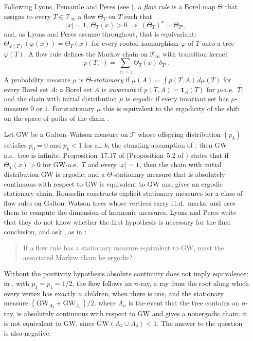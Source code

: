 \documentclass[11pt]{amsart}
\theoremstyle{remark}
\numberwithin{equation}{section}
\newcommand{\T}{\mathcal T}
\newcommand{\GW}{\mathrm{GW}}
\newcommand{\one}{\mathbf 1}
\begin{document}
Following Lyons, Pemantle and Peres \cite{LPP} (see \cite[Section~17.5]{LP}), a \emph{flow rule} is a Borel map $\Theta$ that assigns to every $T\in\T_\infty$ a flow $\Theta_T$ on $T$ such that
\[
|x|=1,\ \Theta_T(x)>0\ \Longrightarrow\ (\Theta_T)^x=\Theta_{T^x},
\]
and, as Lyons and Peres assume throughout, that is equivariant: $\Theta_{\varphi(T)}(\varphi(x))=\Theta_T(x)$ for every rooted isomorphism $\varphi$ of $T$ onto a tree $\varphi(T)$. A flow rule defines the Markov chain on $\T_\infty$ with transition kernel
\[
p(T,\cdot)=\sum_{|x|=1}\Theta_T(x)\,\delta_{T^x}.
\]
A probability measure $\mu$ is $\Theta$-\emph{stationary} if $\mu(A)=\int p(T,A)\,d\mu(T)$ for every Borel set $A$; a Borel set $A$ is \emph{invariant} if $p(T,A)=\one_A(T)$ for $\mu$-a.e.\ $T$; and the chain with initial distribution $\mu$ is \emph{ergodic} if every invariant set has $\mu$-measure $0$ or $1$. For stationary $\mu$ this is equivalent to the ergodicity of the shift on the space of paths of the chain \cite[Corollary~17.3]{LP}.

Let $\GW$ be a Galton--Watson measure on $\T$ whose offspring distribution $(p_k)$ satisfies $p_0=0$ and $p_k<1$ for all $k$, the standing assumption of \cite[Chapter~17]{LP}; then $\GW$-a.e.\ tree is infinite. Proposition~17.17 of \cite{LP} (Proposition~5.2 of \cite{LPP}) states that if $\Theta_T(x)>0$ for $\GW$-a.e.\ $T$ and every $|x|=1$, then the chain with initial distribution $\GW$ is ergodic, and a $\Theta$-stationary measure that is absolutely continuous with respect to $\GW$ is equivalent to $\GW$ and gives an ergodic stationary chain. Rousselin \cite{Ro18} constructs explicit stationary measures for a class of flow rules on Galton--Watson trees whose vertices carry i.i.d.\ marks, and uses them to compute the dimension of harmonic measures. Lyons and Peres write that they do not know whether the first hypothesis is necessary for the final conclusion, and ask \cite[Question~17.18]{LP}, as in \cite[Section~10, Question~3]{LPP}:

\begin{quote}
If a flow rule has a stationary measure equivalent to $\GW$, must the associated Markov chain be ergodic?
\end{quote}

\noindent Without the positivity hypothesis absolute continuity does not imply equivalence: in \cite[Exercise~17.22]{LP}, with $p_3=p_4=1/2$, the flow follows an $n$-ray, a ray from the root along which every vertex has exactly $n$ children, when there is one, and the stationary measure $(\GW_{A_3}+\GW_{A_4})/2$, where $A_n$ is the event that the tree contains an $n$-ray, is absolutely continuous with respect to $\GW$ and gives a nonergodic chain; it is not equivalent to $\GW$, since $\GW(A_3\cup A_4)<1$. The answer to the question is also negative.
\end{document}
